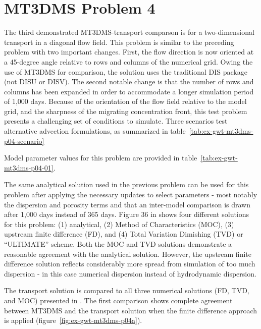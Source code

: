 \section{MT3DMS Problem 4}

The third demonstrated MT3DMS-\mf transport comparson is for a two-dimensional transport in a diagonal flow field. This problem is similar to the preceding problem with two important changes. First, the flow direction is now oriented at a 45-degree angle relative to rows and columns of the numerical grid. Owing the use of MT3DMS for comparison, the \mf solution uses the traditional DIS package (not DISU or DISV).  The second notable change is that the number of rows and columns has been expanded in order to accommodate a longer simulation period of 1,000 days. Because of the orientation of the flow field relative to the model grid, and the sharpness of the migrating concentration front, this test problem presents a challenging set of conditions to simulate. Three scenarios test alternative advection formulations, as summarized in table~\ref{tab:ex-gwt-mt3dms-p04-scenario}



Model parameter values for this problem are provided in table~\ref{tab:ex-gwt-mt3dms-p04-01}.



The same analytical solution used in the previous problem can be used for this problem after applying the necessary updates to select parameters - most notably the dispersion and porosity terms and that an inter-model comparison is drawn after 1,000 days instead of 365 days. Figure 36 in \cite{zheng1999mt3dms} shows four different solutions for this problem: (1) analytical, (2) Method of Characteristics (MOC), (3) upstream finite difference (FD), and (4) Total Variation Dimishing (TVD) or ``ULTIMATE'' scheme.  Both the MOC and TVD solutions demonstrate a reasonable agreement with the analytical solution. However, the upstream finite difference solution reflects considerably more spread from simulation of too much dispersion - in this case numerical dispersion instead of hydrodynamic dispersion. 

The \mf transport solution is compared to all three numerical solutions (FD, TVD, and MOC) presented in \cite{zheng1999mt3dms}. The first comparison shows complete agreement between MT3DMS and the \mf transport solution when the finite difference approach is applied (figure~\ref{fig:ex-gwt-mt3dms-p04a}). 

